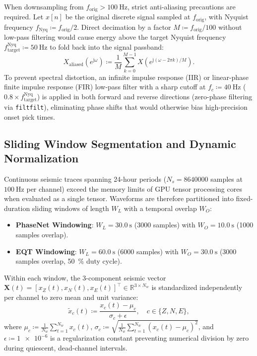 When downsampling from $f_{\mathrm{orig}} > \qty{100}{\hertz}$,
strict anti-aliasing precautions are required. Let $x[n]$ be the
original discrete signal sampled at $f_{\mathrm{orig}}$, with
Nyquist frequency $f_{\mathrm{Nyq}} \coloneqq f_{\mathrm{orig}}/2$. Direct
decimation by a factor $M \coloneqq f_{\mathrm{orig}} / \num{100}$ without
low-pass filtering would cause energy above the target Nyquist
frequency $f_{\mathrm{target}}^{\mathrm{Nyq}} \coloneqq \qty{50}{\hertz}$ to
fold back into the signal passband:
\begin{equation}
  X_{\mathrm{aliased}}(e^{\mathrm{j}\omega}) \coloneqq \frac{1}{M}
  \sum_{k = 0}^{M - 1}
  X\left(e^{\mathrm{j}(\omega - 2\pi k)/M}\right).
\end{equation}
To prevent spectral distortion, an infinite impulse response (IIR)
or linear-phase finite impulse response (FIR) low-pass filter with a
sharp cutoff at $f_c \coloneqq \qty{40}{\hertz}$ ($\num{0.8} \times
f_{\mathrm{target}}^{\mathrm{Nyq}}$) is applied in both forward and
reverse directions (zero-phase filtering via \texttt{filtfilt}),
eliminating phase shifts that would otherwise bias high-precision
onset pick times.

\subsection{Sliding Window Segmentation and Dynamic Normalization}
Continuous seismic traces spanning 24-hour periods ($N_s =
\num{8640000}$ samples at $\qty{100}{\hertz}$ per channel) exceed the
memory limits of GPU tensor processing cores when evaluated as a
single tensor. Waveforms are therefore partitioned into
fixed-duration sliding windows of length $W_L$ with a temporal overlap $W_O$:
\begin{itemize}
  \item \textbf{\ac{PhaseNet} Windowing}: $W_L = \qty{30.0}{\second}$
    (\num{3000} samples) with $W_O = \qty{10.0}{\second}$ (\num{1000}
    samples overlap).
  \item \textbf{\ac{EQT} Windowing}: $W_L = \qty{60.0}{\second}$
    (\num{6000} samples) with $W_O = \qty{30.0}{\second}$ (\num{3000}
    samples overlap, \qty{50}{\percent} duty cycle).
\end{itemize}

Within each window, the 3-component seismic vector $\mathbf{X}(t) =
[x_Z(t), x_N(t), x_E(t)]^\top \in \mathbb{R}^{3 \times N_w}$ is
standardized independently per channel to zero mean and unit variance:
\begin{equation}
  \tilde{x}_c(t) \coloneqq \frac{x_c(t) - \mu_c}{\sigma_c + \epsilon}, \quad
  c \in \{Z, N, E\},
\end{equation}
where $\mu_c \coloneqq \frac{1}{N_w}\sum_{t = 1}^{N_w} x_c(t)$,
$\sigma_c \coloneqq
\sqrt{\frac{1}{N_w}\sum_{t = 1}^{N_w} (x_c(t) - \mu_c)^2}$, and
$\epsilon \coloneqq \num{1e-6}$ is a regularization constant preventing
numerical division by zero during quiescent, dead-channel intervals.

